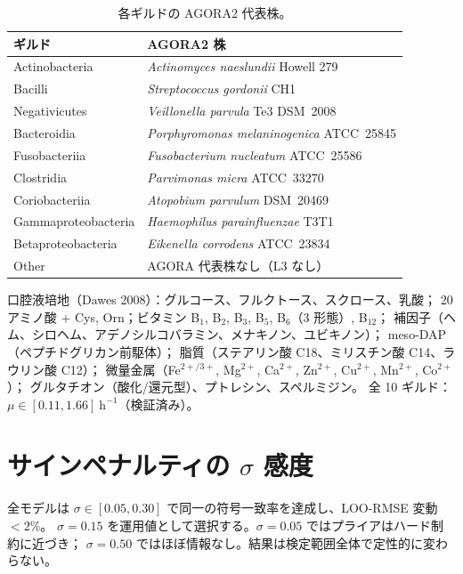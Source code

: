 \documentclass[11pt,a4paper]{article}
\begin{document}
\begin{table}[htb]
\centering
\caption{各ギルドの AGORA2 代表株。}
\label{tab:agora_strains}
\small
\begin{tabular}{ll}
\toprule
ギルド & AGORA2 株 \\
\midrule
Actinobacteria      & \textit{Actinomyces naeslundii} Howell 279 \\
Bacilli             & \textit{Streptococcus gordonii} CH1 \\
Negativicutes       & \textit{Veillonella parvula} Te3 DSM~2008 \\
Bacteroidia         & \textit{Porphyromonas melaninogenica} ATCC~25845 \\
Fusobacteriia       & \textit{Fusobacterium nucleatum} ATCC~25586 \\
Clostridia          & \textit{Parvimonas micra} ATCC~33270 \\
Coriobacteriia      & \textit{Atopobium parvulum} DSM~20469 \\
Gammaproteobacteria & \textit{Haemophilus parainfluenzae} T3T1 \\
Betaproteobacteria  & \textit{Eikenella corrodens} ATCC~23834 \\
Other               & AGORA 代表株なし（L3 なし） \\
\bottomrule
\end{tabular}
\end{table}

口腔液培地（Dawes 2008）：グルコース、フルクトース、スクロース、乳酸；
20 アミノ酸 + Cys, Orn；ビタミン B$_1$, B$_2$, B$_3$, B$_5$, B$_6$（3 形態）, B$_{12}$；
補因子（ヘム、シロヘム、アデノシルコバラミン、メナキノン、ユビキノン）；
meso-DAP（ペプチドグリカン前駆体）；
脂質（ステアリン酸 C18、ミリスチン酸 C14、ラウリン酸 C12）；
微量金属（Fe$^{2+/3+}$, Mg$^{2+}$, Ca$^{2+}$, Zn$^{2+}$, Cu$^{2+}$, Mn$^{2+}$, Co$^{2+}$）；
グルタチオン（酸化/還元型）、プトレシン、スペルミジン。
全 10 ギルド：$\mu\in[0.11, 1.66]\ \text{h}^{-1}$（検証済み）。

\section{サインペナルティの $\sigma$ 感度}
\label{app:sigma}

全モデルは $\sigma\in[0.05,0.30]$ で同一の符号一致率を達成し、LOO-RMSE 変動 $< 2\%$。
$\sigma=0.15$ を運用値として選択する。$\sigma=0.05$ ではプライアはハード制約に近づき；
$\sigma=0.50$ ではほぼ情報なし。結果は検定範囲全体で定性的に変わらない。
\end{document}
